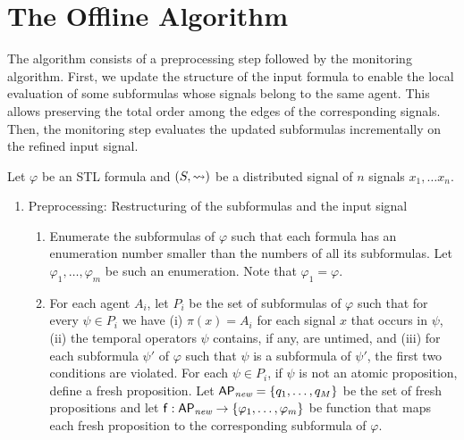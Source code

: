 \section{The Offline Algorithm}
The algorithm consists of a preprocessing step followed by the monitoring algorithm.
First, we update the structure of the input formula to enable the local evaluation of some subformulas whose signals belong to the same agent.
This allows preserving the total order among the edges of the corresponding signals.
Then, the monitoring step evaluates the updated subformulas incrementally on the refined input signal.

Let $\varphi$ be an STL formula and $(S,{\rightsquigarrow})$ be a distributed signal of $n$ signals $x_1, \ldots x_n$.

\begin{enumerate}
	\item Preprocessing: Restructuring of the subformulas and the input signal
	\begin{enumerate}[label=\arabic*.]
		\item
		Enumerate the subformulas of $\varphi$ such that each formula has an enumeration number smaller than the numbers of all its subformulas.
		Let $\varphi_1, \ldots, \varphi_m$ be such an enumeration.
		Note that $\varphi_1 = \varphi$.
		
		\item
		For each agent $A_i$, let $P_i$ be the set of subformulas of $\varphi$ such that for every $\psi \in P_i$ we have
		(i) $\pi(x) = A_i$ for each signal $x$ that occurs in $\psi$,
		(ii) the temporal operators $\psi$ contains, if any, are untimed, and
		(iii) for each subformula $\psi'$ of $\varphi$ such that $\psi$ is a subformula of $\psi'$, the first two conditions are violated.
		For each $\psi \in P_i$, if $\psi$ is not an atomic proposition, define a fresh proposition.
		Let $\mathsf{AP}_{\textit{new}} = \{q_1, \ldots, q_M\}$ be the set of fresh propositions and let $\mathsf{f} : \mathsf{AP}_{\textit{new} }\to \{\varphi_1, \ldots, \varphi_m\}$ be function that maps each fresh proposition to the corresponding subformula of $\varphi$.
		

\end{enumerate}
\end{enumerate}
